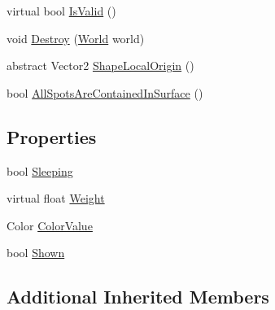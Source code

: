 \begin{DoxyCompactItemize}
\item 
virtual bool \hyperlink{classgearit_1_1src_1_1robot_1_1_piece_a681c42311965842c33374dcce7023e07}{Is\+Valid} ()
\item 
void \hyperlink{classgearit_1_1src_1_1robot_1_1_piece_ac088c3e9dcb9882e880d6e910ead101d}{Destroy} (\hyperlink{class_farseer_physics_1_1_dynamics_1_1_world}{World} world)
\item 
abstract Vector2 \hyperlink{classgearit_1_1src_1_1robot_1_1_piece_ab921691e385a02bfcdb99af25f276260}{Shape\+Local\+Origin} ()
\item 
bool \hyperlink{classgearit_1_1src_1_1robot_1_1_piece_a969fdc25f07ef2b1fc15aa360a157efd}{All\+Spots\+Are\+Contained\+In\+Surface} ()
\end{DoxyCompactItemize}
\subsection*{Properties}
\begin{DoxyCompactItemize}
\item 
bool \hyperlink{classgearit_1_1src_1_1robot_1_1_piece_a22837d8d8ce49065a18a64df4397641d}{Sleeping}
\item 
virtual float \hyperlink{classgearit_1_1src_1_1robot_1_1_piece_a296326e78b47f09749230b97d8a00b6c}{Weight}
\item 
Color \hyperlink{classgearit_1_1src_1_1robot_1_1_piece_a4600408118052b88110902c3386d4255}{Color\+Value}
\item 
bool \hyperlink{classgearit_1_1src_1_1robot_1_1_piece_a7f04d7c15839af2c999187e7b7fdd278}{Shown}
\end{DoxyCompactItemize}
\subsection*{Additional Inherited Members}


